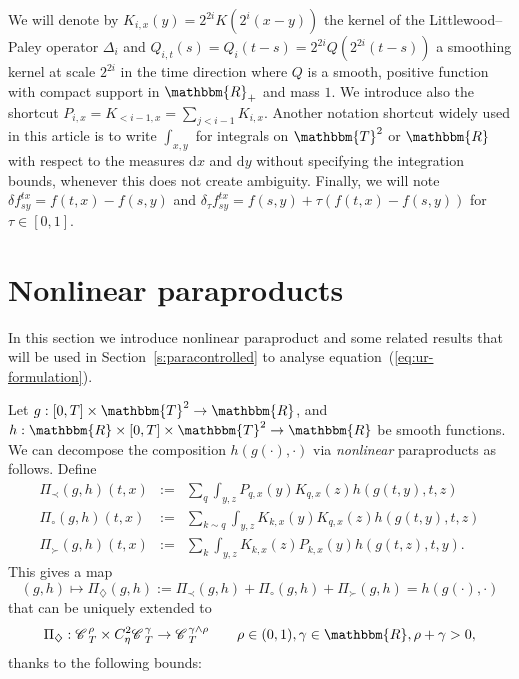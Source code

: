\documentclass{amsart}
\newcommand{\assign}{:=}
\newcommand{\cdummy}{\cdot}
\newcommand{\mathd}{\mathrm{d}}
\newcommand{\nocomma}{}
\newcommand{\tmtextit}[1]{{\itshape{#1}}}
\theoremstyle{remark}
\theoremstyle{definition}
\newcommand{\CC}{\mathscr{C} \hspace{.1em}}
\begin{document}
We will denote by $K_{i, x} (y) = 2^{2 i} K (2^i (x - y))$ the kernel of the
Littlewood--Paley operator $\Delta_i$ and $Q_{i, t} (s) = Q_i (t - s) = 2^{2
i} Q (2^{2 i} (t - s))$ a smoothing kernel at scale $2^{2 i}$ in the time
direction where $Q$ is a smooth, positive function with compact support in
$\mathbbm{R}_+$ and mass $1$. We introduce also the shortcut $P_{i, x} = K_{<
i - 1, x} = \sum_{j < i - 1} K_{i, x}$. Another notation shortcut widely used
in this article is to write $\int_{x, y}$ for integrals on $\mathbbm{T}^2$ or
$\mathbbm{R}$ with respect to the measures $\mathd x$ and $\mathd y$ without
specifying the integration bounds, whenever this does not create ambiguity.
Finally, we will note $\delta f^{t x}_{s y} = f (t, x) - f (s, y)$ and
$\delta_{\tau} f_{s y}^{t x} = f (s, y) + \tau (f (t, x) - f (s, y))$ for
$\tau \in [0, 1]$.

\section{Nonlinear paraproducts}\label{s:nonlinear}

In this section we introduce nonlinear paraproduct and some related results
that will be used in Section~\ref{s:paracontrolled} to analyse
equation~(\ref{eq:ur-formulation}).

Let $g : [0, T] \times \mathbbm{T}^2 \rightarrow \mathbbm{R}$, and $h :
\mathbbm{R} \times [0, T] \times \mathbbm{T}^2 \rightarrow \mathbbm{R}$ be
smooth functions. We can decompose the composition $h (g (\cdummy), \cdummy)$
via \tmtextit{nonlinear} paraproducts as follows. Define
\begin{eqnarray}
  \Pi_{\prec} (g, h) (t, x) & \assign & \sum_q \int_{y, z} P_{q, x} (y) K_{q,
  x} (z) h (g (t, y), t, z)  \label{e:nonlin-par-small}\\
  \Pi_{\circ} (g, h) (t, x) & \assign & \sum_{k \sim q} \int_{y, z} K_{k, x}
  (y) K_{q, x} (z) h (g (t, y), t, z)  \label{e:nonlin-par-same}\\
  \Pi_{\succ} (g, h) (t, x) & \assign & \sum_k \int_{y, z} K_{k, x} (z) P_{k,
  x} (y) h (g (t, z), t, y) .  \label{e:nonlin-par-big}
\end{eqnarray}
This gives a map
\begin{equation}
  (g, h) \mapsto \Pi_{\nocomma \diamondsuit} (g, h) \assign \Pi_{\prec} (g, h)
  + \Pi_{\circ} (g, h) + \Pi_{\succ} (g, h) = h (g (\cdot), \cdot) 
  \label{e:nonlin-decomp}
\end{equation}
that can be uniquely extended to
\[ \Pi_{\diamondsuit} : \CC_T^{\rho} \times C^2_{\eta} \CC_T^{\gamma}
   \rightarrow \CC_T^{\gamma \wedge \rho} \qquad \rho \in (0, 1), \gamma \in
   \mathbbm{R}, \rho + \gamma > 0, \]
thanks to the following bounds:
\end{document}

